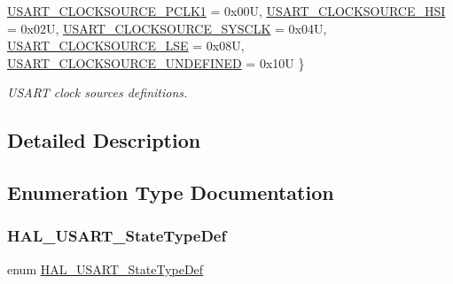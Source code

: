 \begin{DoxyCompactItemize}
\hyperlink{group___u_s_a_r_t___exported___types_gga1078d736732d921b19a0b0f76e323147a51095369bd95bca747f3c476fefc9ae6}{U\+S\+A\+R\+T\+\_\+\+C\+L\+O\+C\+K\+S\+O\+U\+R\+C\+E\+\_\+\+P\+C\+L\+K1} = 0x00U, 
\hyperlink{group___u_s_a_r_t___exported___types_gga1078d736732d921b19a0b0f76e323147a5c3ffebfcc228458026964619cfa2c7a}{U\+S\+A\+R\+T\+\_\+\+C\+L\+O\+C\+K\+S\+O\+U\+R\+C\+E\+\_\+\+H\+SI} = 0x02U, 
\hyperlink{group___u_s_a_r_t___exported___types_gga1078d736732d921b19a0b0f76e323147ad36b7de97f233998b51a26af0a140f38}{U\+S\+A\+R\+T\+\_\+\+C\+L\+O\+C\+K\+S\+O\+U\+R\+C\+E\+\_\+\+S\+Y\+S\+C\+LK} = 0x04U, 
\hyperlink{group___u_s_a_r_t___exported___types_gga1078d736732d921b19a0b0f76e323147a08d8994072be458945a35c1d1c9e1f05}{U\+S\+A\+R\+T\+\_\+\+C\+L\+O\+C\+K\+S\+O\+U\+R\+C\+E\+\_\+\+L\+SE} = 0x08U, 
\newline
\hyperlink{group___u_s_a_r_t___exported___types_gga1078d736732d921b19a0b0f76e323147a436b4310f32fe086566cbd1bf56cd398}{U\+S\+A\+R\+T\+\_\+\+C\+L\+O\+C\+K\+S\+O\+U\+R\+C\+E\+\_\+\+U\+N\+D\+E\+F\+I\+N\+ED} = 0x10U
 \}\begin{DoxyCompactList}\small\item\em U\+S\+A\+RT clock sources definitions. \end{DoxyCompactList}
\end{DoxyCompactItemize}


\subsection{Detailed Description}


\subsection{Enumeration Type Documentation}
\mbox{\label{group___u_s_a_r_t___exported___types_ga502e7abdfa6b24f0f6b40cf60c7383c5}} 
\subsubsection{\texorpdfstring{H\+A\+L\+\_\+\+U\+S\+A\+R\+T\+\_\+\+State\+Type\+Def}{HAL\_USART\_StateTypeDef}}
{\footnotesize\ttfamily enum \hyperlink{group___u_s_a_r_t___exported___types_ga502e7abdfa6b24f0f6b40cf60c7383c5}{H\+A\+L\+\_\+\+U\+S\+A\+R\+T\+\_\+\+State\+Type\+Def}}



